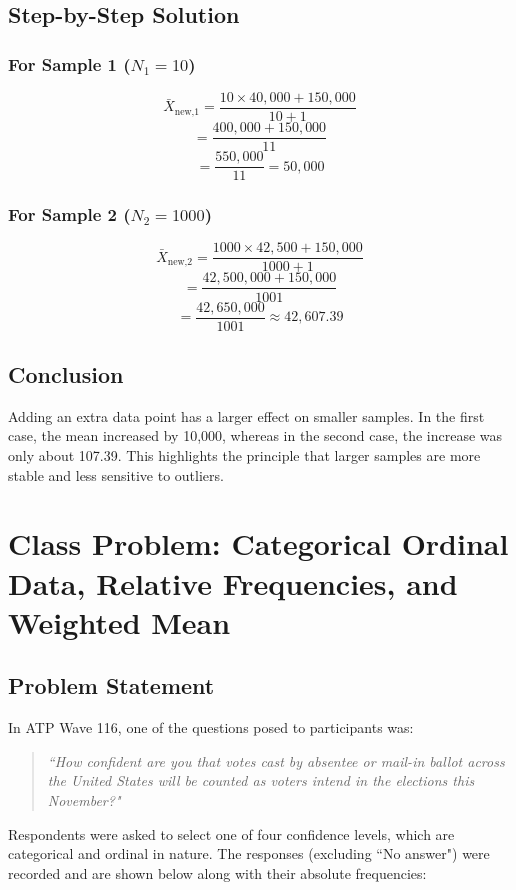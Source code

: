 \documentclass{article}
\begin{document}
\subsection*{Step-by-Step Solution}

\subsubsection*{For Sample 1 (\(N_1 = 10\))}
\[
\bar{X}_{\text{new,1}} = \frac{10 \times 40,000 + 150,000}{10+1}
\]
\[
= \frac{400,000 + 150,000}{11}
\]
\[
= \frac{550,000}{11} = 50,000
\]

\subsubsection*{For Sample 2 (\(N_2 = 1000\))}
\[
\bar{X}_{\text{new,2}} = \frac{1000 \times 42,500 + 150,000}{1000+1}
\]
\[
= \frac{42,500,000 + 150,000}{1001}
\]
\[
= \frac{42,650,000}{1001} \approx 42,607.39
\]

\subsection*{Conclusion}
Adding an extra data point has a larger effect on smaller samples. In the first case, the mean increased by 10,000, whereas in the second case, the increase was only about 107.39. This highlights the principle that larger samples are more stable and less sensitive to outliers.

\section{Class Problem: Categorical Ordinal Data, Relative Frequencies, and Weighted Mean}
\subsection*{Problem Statement}

In ATP Wave 116, one of the questions posed to participants was:

\begin{quote}
\emph{``How confident are you that votes cast by absentee or mail-in ballot across the United States will be counted as voters intend in the elections this November?"}
\end{quote}

Respondents were asked to select one of four confidence levels, which are categorical and ordinal in nature. The responses (excluding ``No answer") were recorded and are shown below along with their absolute frequencies:
\end{document}
